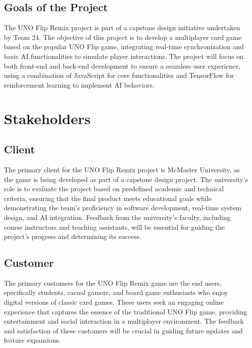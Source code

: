 \documentclass{article}
\begin{document}
\subsection{Goals of the Project}
The UNO Flip Remix project is part of a capstone design initiative undertaken by Team 24. The objective of this project is to develop a multiplayer card game based on the popular UNO Flip game, integrating real-time synchronization and basic AI functionalities to simulate player interactions. The project will focus on both front-end and back-end development to ensure a seamless user experience, using a combination of JavaScript for core functionalities and TensorFlow for reinforcement learning to implement AI behaviors.

\section{Stakeholders}

\subsection{Client}
The primary client for the UNO Flip Remix project is McMaster University, as the game is being developed as part of a capstone design project. The university's role is to evaluate the project based on predefined academic and technical criteria, ensuring that the final product meets educational goals while demonstrating the team's proficiency in software development, real-time system design, and AI integration. Feedback from the university's faculty, including course instructors and teaching assistants, will be essential for guiding the project's progress and determining its success.

\subsection{Customer}
The primary customers for the UNO Flip Remix game are the end users, specifically students, casual gamers, and board game enthusiasts who enjoy digital versions of classic card games. These users seek an engaging online experience that captures the essence of the traditional UNO Flip game, providing entertainment and social interaction in a multiplayer environment. The feedback and satisfaction of these customers will be crucial in guiding future updates and feature expansions.

\end{document}
